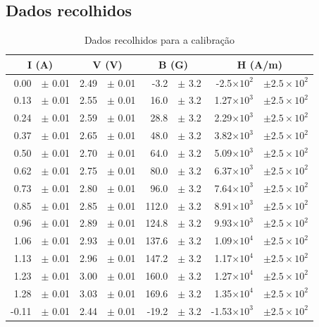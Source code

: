 \documentclass[a4paper]{article}
\begin{document}
\subsection{Dados recolhidos}
\begin{table}[htbp]
\center
\caption{Dados recolhidos para a calibração}
\begin{tabular}{rlrlrlrl}
\hline
\multicolumn{ 2}{c}{I (A)} & \multicolumn{ 2}{c}{V (V)} & \multicolumn{ 2}{c}{B (G)} & \multicolumn{ 2}{c}{H (A/m)} \\ \hline

0.00 & $\pm$ 0.01 & 2.49 & $\pm$ 0.01 & -3.2 & $\pm$ 3.2 & -2.5$\times 10^{2}$ & $\pm 2.5 \times 10^{2}$  \\ 
0.13 & $\pm$ 0.01 & 2.55 & $\pm$ 0.01 & 16.0 & $\pm$ 3.2 & 1.27$\times 10^{3}$ & $\pm 2.5 \times 10^{2}$  \\ 
0.24 & $\pm$ 0.01 & 2.59 & $\pm$ 0.01 & 28.8 & $\pm$ 3.2 & 2.29$\times 10^{3}$ & $\pm 2.5 \times 10^{2}$  \\ 
0.37 & $\pm$ 0.01 & 2.65 & $\pm$ 0.01 & 48.0 & $\pm$ 3.2 & 3.82$\times 10^{3}$ & $\pm 2.5 \times 10^{2}$  \\ 
0.50 & $\pm$ 0.01 & 2.70 & $\pm$ 0.01 & 64.0 & $\pm$ 3.2 & 5.09$\times 10^{3}$ & $\pm 2.5 \times 10^{2}$  \\ 
0.62 & $\pm$ 0.01 & 2.75 & $\pm$ 0.01 & 80.0 & $\pm$ 3.2 & 6.37$\times 10^{3}$ & $\pm 2.5 \times 10^{2}$  \\ 
0.73 & $\pm$ 0.01 & 2.80 & $\pm$ 0.01 & 96.0 & $\pm$ 3.2 & 7.64$\times 10^{3}$ & $\pm 2.5 \times 10^{2}$  \\ 
0.85 & $\pm$ 0.01 & 2.85 & $\pm$ 0.01 & 112.0 & $\pm$ 3.2 & 8.91$\times 10^{3}$ & $\pm 2.5 \times 10^{2}$  \\ 
0.96 & $\pm$ 0.01 & 2.89 & $\pm$ 0.01 & 124.8 & $\pm$ 3.2 & 9.93$\times 10^{3}$ & $\pm 2.5 \times 10^{2}$  \\ 
1.06 & $\pm$ 0.01 & 2.93 & $\pm$ 0.01 & 137.6 & $\pm$ 3.2 & 1.09$\times 10^{4}$ & $\pm 2.5 \times 10^{2}$  \\ 
1.13 & $\pm$ 0.01 & 2.96 & $\pm$ 0.01 & 147.2 & $\pm$ 3.2 & 1.17$\times 10^{4}$ & $\pm 2.5 \times 10^{2}$  \\ 
1.23 & $\pm$ 0.01 & 3.00 & $\pm$ 0.01 & 160.0 & $\pm$ 3.2 & 1.27$\times 10^{4}$ & $\pm 2.5 \times 10^{2}$  \\ 
1.28 & $\pm$ 0.01 & 3.03 & $\pm$ 0.01 & 169.6 & $\pm$ 3.2 & 1.35$\times 10^{4}$ & $\pm 2.5 \times 10^{2}$  \\ 
-0.11 & $\pm$ 0.01 & 2.44 & $\pm$ 0.01 & -19.2 & $\pm$ 3.2 & -1.53$\times 10^{3}$ & $\pm 2.5 \times 10^{2}$  \\ 

\end{tabular}
\end{table}
\end{document}
